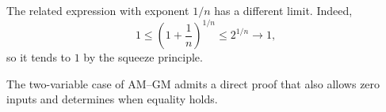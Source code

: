 \begin{remark}
  The related expression with exponent $1/n$ has a different limit.
  Indeed,
  \[
    1\le\left(1+\frac1n\right)^{1/n}\le2^{1/n}\longrightarrow1,
  \]
  so it tends to $1$ by the squeeze principle.
\end{remark}

The two-variable case of AM--GM admits a direct proof that also allows
zero inputs and determines when equality holds.


